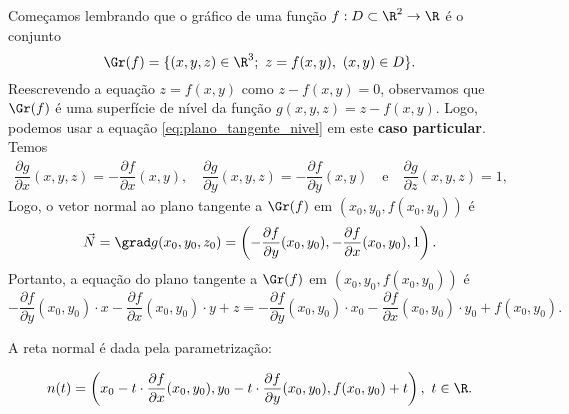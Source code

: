 
Começamos lembrando que o gráfico de uma função $f:D\subset \R^2\to \R$ é o conjunto 
$$\Gr(f)=\{(x,y,z)\in\R^3;~z=f(x,y),~(x,y)\in D\}.$$
Reescrevendo a equação $z=f(x,y)$ como $z-f(x,y)=0$, observamos que $\Gr(f)$ é uma superfície de nível da função $g(x,y,z)=z-f(x,y)$. Logo,  podemos usar a equação \eqref{eq:plano_tangente_nivel} em este \textbf{caso particular}. Temos
\begin{align*}
    \dfrac{\partial g}{\partial x}(x,y,z)=-\dfrac{\partial f}{\partial x}(x,y),\quad 
    \dfrac{\partial g}{\partial y}(x,y,z)=-\dfrac{\partial f}{\partial y}(x,y)\quad \mbox{e} \quad 
    \dfrac{\partial g}{\partial z}(x,y,z)=1,
\end{align*}
Logo, o vetor normal ao plano tangente a $\Gr(f)$ em $(x_0,y_0,f(x_0,y_0))$ é 
\begin{equation}\label{vetor_N_grafico}
\Vec{N}=\grad g (x_0,y_0,z_0) = \left(-\dfrac{\partial f}{\partial y}(x_0,y_0),-\dfrac{\partial f}{\partial x}(x_0,y_0),1\right).
\end{equation}
Portanto, a equação do plano tangente a $\Gr(f)$ em $(x_0,y_0,f(x_0,y_0))$ é
\begin{equation}\label{eq:plano_tang_graficos}
-\dfrac{\partial f}{\partial y}(x_0,y_0)\cdot x -\dfrac{\partial f}{\partial x}(x_0,y_0) \cdot y + z = -\dfrac{\partial f}{\partial y}(x_0,y_0)\cdot x_0 -\dfrac{\partial f}{\partial x}(x_0,y_0) \cdot y_0 + f(x_0,y_0).
\end{equation}

A reta normal é dada pela parametrização: 
\begin{comment}
$$
\begin{cases}
    x(t)=x_0 - t \cdot \dfrac{\partial f}{\partial x}(x_0,y_0)\\[.5em]
    y(t)=y_0 - t\cdot \dfrac{\partial f}{\partial y}(x_0,y_0)\\[.5em]
    z(t)=f(x_0,y_0) + t. 
\end{cases}
$$
\end{comment}
$$n(t)=\left(x_0 - t \cdot \dfrac{\partial f}{\partial x}(x_0,y_0),y_0 - t\cdot \dfrac{\partial f}{\partial y}(x_0,y_0), f(x_0,y_0) + t\right),~t\in\R. 
$$
